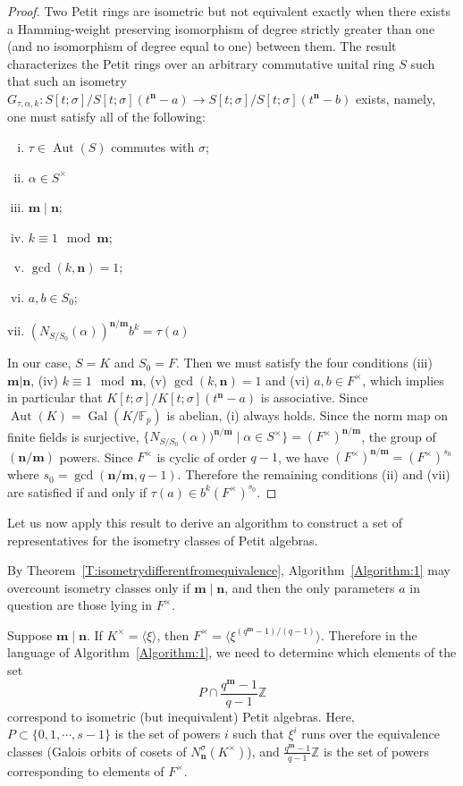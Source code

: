 \documentclass[11pt]{amsart}
\theoremstyle{plain}
\theoremstyle{definition}
\numberwithin{equation}{section}
\numberwithin{figure}{section}
\newcommand{\ZZ}{\mathbb{Z}}
\newcommand{\FF}{\mathbb{F}}
\newcommand{\Sone}[1]{\Stsigma/\Stsigma (t^{\de}-#1)}
\newcommand{\ring}{S}
\newcommand{\Stsigma}{S[t;\sigma]}
\newcommand{\Kone}[1]{K[t;\sigma]/K[t;\sigma](t^{\de}-#1)}
\newcommand{\os}{{\mathbf{m}}}  %
\newcommand{\de}{{\mathbf{n}}}  %
\DeclareMathOperator{\Gal}{Gal}
\DeclareMathOperator{\Aut}{Aut}
\begin{document}
\begin{proof}
Two Petit rings are isometric but not equivalent exactly when there exists a Hamming-weight preserving isomorphism of degree strictly greater than one (and no isomorphism of degree equal to one) between them.
    The result \cite[Theorem 4.4]{NevinsPumpluen2025} characterizes the Petit rings over an arbitrary commutative unital ring $S$ such that such an isometry $G_{\tau,\alpha,k}:\Sone{a}\to\Sone{b}$ exists, namely, one must satisfy all of the following:
    \begin{enumerate}[(i)]
    \item $\tau\in \Aut(\ring)$ commutes with $\sigma$;
    \item $\alpha \in \ring^\times$
    \item $\os\mid \de$;
        \item  $k\equiv 1 \mod \os$;
        \item  $\gcd(k,\de)=1$;
                \item $a, b\in \ring_0$;
        \item  $(N_{\ring/\ring_0}(\alpha))^{\de/\os}b^k=\tau(a)$
    \end{enumerate}
In our case, $S=K$ and $S_0=F$.  Then we must satisfy the four conditions (iii) $\os|\de$, (iv) $k\equiv 1 \mod \os$, (v) $\gcd(k,\de)=1$ and (vi) $a,b\in F^\times$, which implies in particular that $\Kone{a}$ is associative.  Since $\Aut(K)=\Gal(K/\FF_p)$ is abelian, (i) always holds.  Since the norm map on finite fields is surjective, $\{N_{\ring/\ring_0}(\alpha))^{\de/\os}\mid \alpha\in \ring^\times\}= (F^\times)^{\de/\os}$, the group of $(\de/\os)$ powers.  Since $F^\times$ is cyclic of order $q-1$, we have $(F^\times)^{\de/\os}=(F^\times)^{s_0}$ where $s_0=\gcd(\de/\os,q-1)$.  Therefore the remaining conditions (ii) and (vii) are satisfied if and only if $\tau(a)\in b^k(F^\times)^{s_0}$.
\end{proof}

Let us now apply this result to derive an algorithm to construct a set of representatives for the isometry classes of Petit algebras.

By Theorem~\ref{T:isometrydifferentfromequivalence}, Algorithm~\ref{Algorithm:1} may overcount isometry classes only if $\os\mid\de$, and then the only parameters $a$ in question are those lying in $F^\times$.

Suppose $\os\mid\de$.
If $K^\times = \langle \xi \rangle$, then $F^\times = \langle \xi^{(q^\os-1)/(q-1)}\rangle$.  Therefore  in the language of Algorithm~\ref{Algorithm:1}, we need to determine which elements of the set
$$
P \cap \frac{q^\os-1}{q-1}\ZZ
$$
correspond to isometric (but inequivalent) Petit algebras.  Here, $P\subset \{0,1,\cdots, s-1\}$ is the set of powers $i$ such that $\xi^i$ runs over the equivalence classes (Galois orbits of cosets of $N_\de^\sigma(K^\times)$), and $\frac{q^\os-1}{q-1}\ZZ$ is the set of powers corresponding to elements of $F^\times$.
\end{document}
